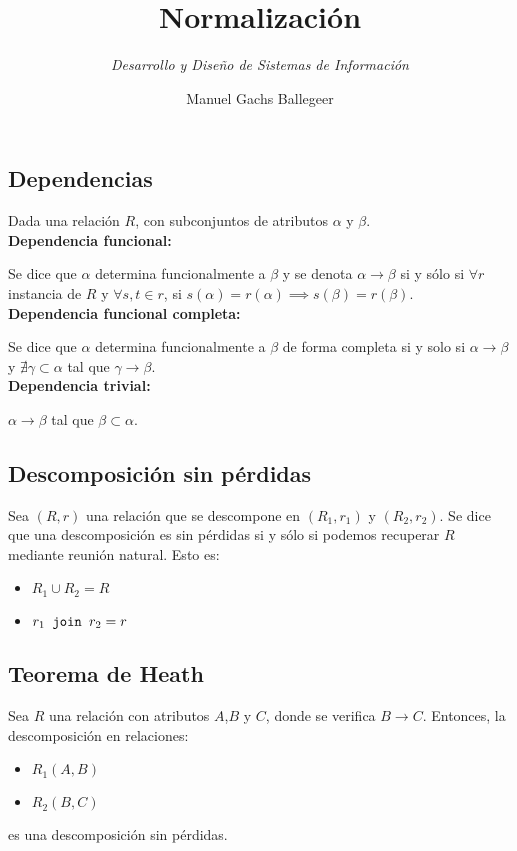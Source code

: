 \documentclass[12pt,a4paper]{article}
\theoremstyle{ejemplo}
\theoremstyle{algoritmo}
\begin{document}
\title{\Huge{\textbf{Normalización}}}
\author{\Large{\textit{Desarrollo y Diseño de Sistemas de Información}}}
\date{Manuel Gachs Ballegeer}
\maketitle

\subsection*{Dependencias}
Dada una relación $R$, con subconjuntos de atributos $\alpha$ y $\beta$.
\\

\textbf{Dependencia funcional:}

Se dice que $\alpha$ determina funcionalmente a $\beta$ y se denota $\alpha\to
\beta$ si y sólo si $\forall r$ instancia de $R$ y $\forall s,t\in r$, si
$s(\alpha)=r(\alpha)\implies s(\beta)=r(\beta)$.
\\

\textbf{Dependencia funcional completa:}

Se dice que $\alpha$ determina funcionalmente a $\beta$ de forma completa si y
solo si $\alpha\to\beta$ y $\nexists\gamma\subset\alpha$ tal que $\gamma\to
\beta$.
\\

\textbf{Dependencia trivial:}

$\alpha\to\beta$ tal que $\beta\subset\alpha$.

\subsection*{Descomposición sin pérdidas}
Sea $(R,r)$ una relación que se descompone en $(R_1,r_1)$ y $(R_2,r_2)$. Se dice
que una descomposición es sin pérdidas si y sólo si podemos recuperar $R$ 
mediante reunión natural. Esto es:
\begin{itemize}
	\item [] $R_1\cup R_2=R$
	\item [] $r_1\text{\texttt{ join }}r_2=r$
\end{itemize}

\subsection*{Teorema de Heath}
Sea $R$ una relación con atributos $A$,$B$ y $C$, donde se verifica $B\to C$.
Entonces, la descomposición en relaciones:
\begin{itemize}
	\item [] $R_1(A,B)$
	\item [] $R_2(B,C)$
\end{itemize}
es una descomposición sin pérdidas.
\end{document}
